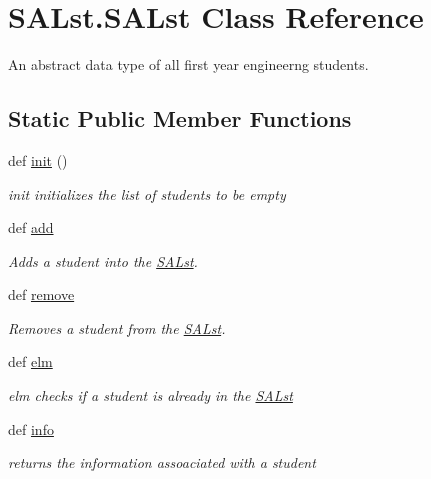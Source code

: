 \hypertarget{class_s_a_lst_1_1_s_a_lst}{}\section{S\+A\+Lst.\+S\+A\+Lst Class Reference}
\label{class_s_a_lst_1_1_s_a_lst}


An abstract data type of all first year engineerng students.  


\subsection*{Static Public Member Functions}
\begin{DoxyCompactItemize}
\item 
\mbox{\label{class_s_a_lst_1_1_s_a_lst_ac0886d79feebf875207b927b6d23a959}} 
def \hyperlink{class_s_a_lst_1_1_s_a_lst_ac0886d79feebf875207b927b6d23a959}{init} ()
\begin{DoxyCompactList}\small\item\em init initializes the list of students to be empty \end{DoxyCompactList}\item 
def \hyperlink{class_s_a_lst_1_1_s_a_lst_af097359087eff2e52ff94bcf1adfcb65}{add}
\begin{DoxyCompactList}\small\item\em Adds a student into the \hyperlink{class_s_a_lst_1_1_s_a_lst}{S\+A\+Lst}. \end{DoxyCompactList}\item 
def \hyperlink{class_s_a_lst_1_1_s_a_lst_a6c80e47dc1bacbb55188c22cd85af8b6}{remove}
\begin{DoxyCompactList}\small\item\em Removes a student from the \hyperlink{class_s_a_lst_1_1_s_a_lst}{S\+A\+Lst}. \end{DoxyCompactList}\item 
def \hyperlink{class_s_a_lst_1_1_s_a_lst_a400ec4c9364988723f6396b278cebf6a}{elm}
\begin{DoxyCompactList}\small\item\em elm checks if a student is already in the \hyperlink{class_s_a_lst_1_1_s_a_lst}{S\+A\+Lst} \end{DoxyCompactList}\item 
def \hyperlink{class_s_a_lst_1_1_s_a_lst_a036cbb53a35ec5cd293617ca24c522fd}{info}
\begin{DoxyCompactList}\small\item\em returns the information assoaciated with a student \end{DoxyCompactList}\item 

\end{DoxyCompactItemize}
